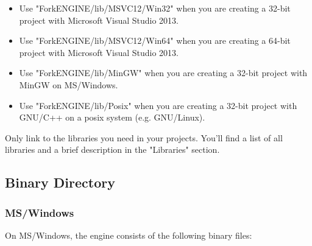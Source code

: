 \documentclass{article}
\begin{document}
\begin{itemize}

\item
Use "ForkENGINE/lib/MSVC12/Win32" when you are creating a 32-bit project with Microsoft Visual Studio 2013.

\item
Use "ForkENGINE/lib/MSVC12/Win64" when you are creating a 64-bit project with Microsoft Visual Studio 2013.

\item
Use "ForkENGINE/lib/MinGW" when you are creating a 32-bit project with MinGW on MS/Windows.

\item
Use "ForkENGINE/lib/Posix" when you are creating a 32-bit project with GNU/C++ on a posix system (e.g. GNU/Linux).

\end{itemize}

Only link to the libraries you need in your projects.
You'll find a list of all libraries and a brief description in the "Libraries" section.

\subsection{Binary Directory}

\subsubsection{MS/Windows}
On MS/Windows, the engine consists of the following binary files:
\end{document}

